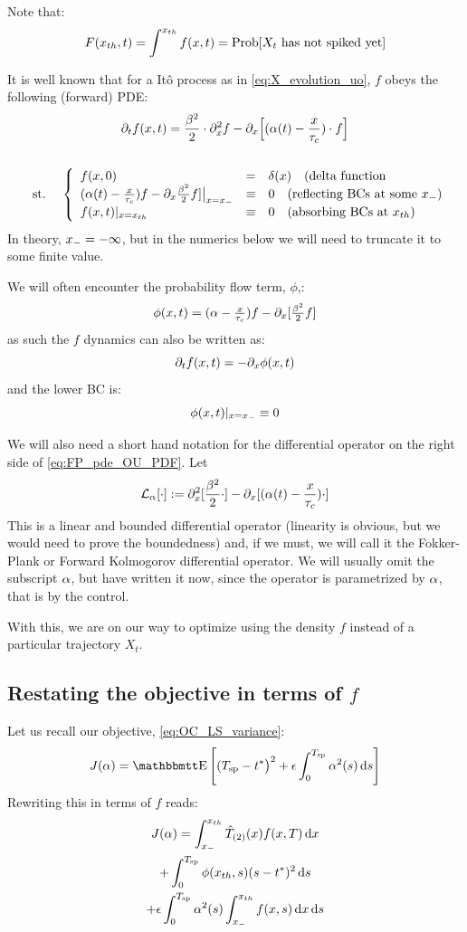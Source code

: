 \documentclass{article}
\begin{document}
Note that:
$$
F({ x_{th} },t) = \int^{ x_{th} } f(x,t) = \operatorname{Prob}[X_t \textrm{ has not spiked yet}]
$$

It is well known that for a It\^o process as in \cref{eq:X_evolution_uo},
$f$ obeys the following (forward) PDE:
\begin{equation}
\begin{gathered}
{\partial}_t f(x,t) =
				\frac{{\beta}^2 }{2}\cdot {\partial}^2_x f -  
				{\partial}_x \Big[ ({\alpha}(t)- \frac{x}{{ \tau_{c} }})  \cdot f \Big]
\\
\\
\begin{array}{lll}
	&\textrm{st.\ }& 
	\left\{ \begin{array}{lcl}
	 f(x,0) &=& \delta(x) \quad (\textrm{delta function}
	\\
	({\alpha}(t)- \tfrac x {{ \tau_{c} }})f - {\partial}_x \tfrac {{\beta}^2}2 f] \big|_{x={ x_{-} }} &\equiv& 0
	\quad (\textrm{reflecting BCs at some } { x_{-} } )
	\\
	f(x,t) |_{x={ x_{th} }} &\equiv& 0 \quad (\textrm{absorbing BCs at } { x_{th} })
\end{array} \right. 
\end{array}
\label{eq:FP_pde_OU_PDF}
\end{gathered}
\end{equation}
In theory, ${ x_{-} } = -\infty$, but in the numerics below we will need to
truncate it to some finite value.

We will often encounter the probability flow term, $\phi$,:
$$
\phi(x,t) = ({\alpha}- \tfrac x {{ \tau_{c} }})f - {\partial}_x [\tfrac {{\beta}^2}2 f]
$$
as such the $f$ dynamics can also be written as:
$$
{\partial}_t f(x,t) = - {\partial}_x \phi(x,t)
$$
and the lower BC is:
$$
\phi(x,t) |_{x={ x_{-} }} \equiv 0
$$

We will also need a short hand notation for the differential operator on the
right side of \cref{eq:FP_pde_OU_PDF}. Let
$$
{ \mathcal{L} }_{\alpha}[\cdot] := {\partial}^2_x [ \frac{{\beta}^2 }{2} \cdot] -  
				{\partial}_x  [ ({\alpha}(t)- \frac{x}{{ \tau_{c} }}) \cdot]
$$
This is a linear and bounded differential operator (linearity is obvious, but
we would need to prove the boundedness) and, if we must, we will call it the
Fokker-Plank or Forward Kolmogorov differential operator. We will usually omit the
subscript ${\alpha}$, but have written it now, since the operator is parametrized by
${\alpha}$, that is by the control.

With this, we are on our way to optimize using the density $f$ instead of a
particular trajectory $X_t$.

\subsection{Restating the objective in terms of $f$}
Let us recall our objective, \cref{eq:OC_LS_variance}:
$$
J(\a) = \Exp\left[
(\ts - \T \big)^2 
+  
\e \int_0^\ts  \a^2(s) \intd{s}
\right]
$$
Rewriting this in terms of $f$ reads:
\begin{multline}
J({\alpha}) = 
\int_{ x_{-} }^{ x_{th} } { \hat{T}_{(2)} }(x) f(x,T) \, \mathrm{d} x
\\
+ \int_0^{ T_{\textrm{sp} } } \phi({ x_{th} }, s) (s-{ t^* })^2 \, \mathrm{d} s
\\
+  {\epsilon} \int_0^{ T_{\textrm{sp} } }  {\alpha}^2(s)  \int_{ x_{-} }^{ x_{th} } f(x,s) \, \mathrm{d} x \, \mathrm{d} s
\label{eq:OC_LS_variance_density}
\end{multline}
\end{document}
